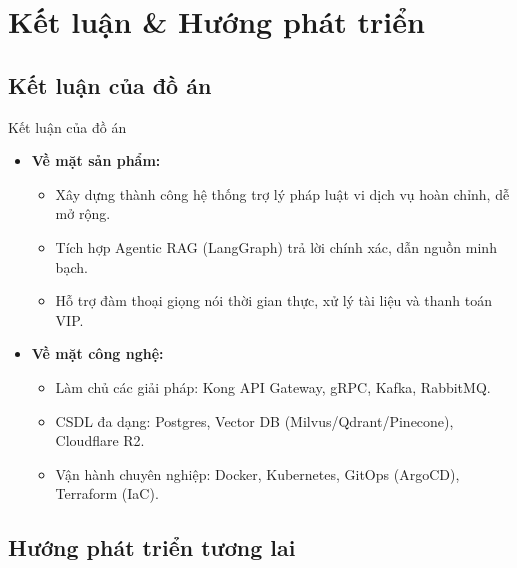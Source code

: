 \section{Kết luận \& Hướng phát triển}
\subsection{Kết luận của đồ án}

\begin{frame}{Kết luận của đồ án}
\begin{itemize}
\item \textbf{Về mặt sản phẩm:}
\begin{itemize}
\item Xây dựng thành công hệ thống trợ lý pháp luật vi dịch vụ hoàn chỉnh, dễ mở rộng.
\item Tích hợp Agentic RAG (LangGraph) trả lời chính xác, dẫn nguồn minh bạch.
\item Hỗ trợ đàm thoại giọng nói thời gian thực, xử lý tài liệu và thanh toán VIP.
\end{itemize}
\item \textbf{Về mặt công nghệ:}
\begin{itemize}
\item Làm chủ các giải pháp: Kong API Gateway, gRPC, Kafka, RabbitMQ.
\item CSDL đa dạng: Postgres, Vector DB (Milvus/Qdrant/Pinecone), Cloudflare R2.
\item Vận hành chuyên nghiệp: Docker, Kubernetes, GitOps (ArgoCD), Terraform (IaC).
\end{itemize}
\end{itemize}

\end{frame}

\subsection{Hướng phát triển tương lai}

